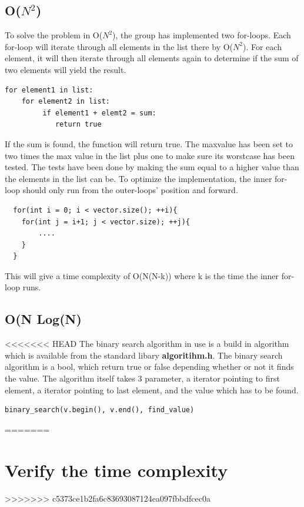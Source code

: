 \subsection{O(\(N^{2}\))}
To solve the problem in O(\(N^{2}\)), the group has implemented two for-loops. Each for-loop will iterate through all elements in the list there by O(\(N^{2}\)). For each element, it will then iterate through all elements again to determine if the sum of two elements will yield the result.
\begin{lstlisting}
for element1 in list:
    for element2 in list:
         if element1 + elemt2 = sum:
            return true
\end{lstlisting}
If the sum is found, the function will return true.
The maxvalue has been set to two times the max value in the list plus one to make sure its worstcase has been tested.
The tests have been done by making the sum equal to a higher value than the elements in the list can be.
To optimize the implementation, the inner for-loop should only run from the outer-loops' position and forward.
\begin{lstlisting}
  for(int i = 0; i < vector.size(); ++i){
  	for(int j = i+1; j < vector.size); ++j){
  		....
  	}
  }
\end{lstlisting}

This will give a time complexity of O(N(N-k)) where k is the time the inner for-loop runs.
\subsection{O(N Log(N)}

<<<<<<< HEAD
The binary search algorithm in use is a build in algorithm which is available from the standard libary \textbf{algoritihm.h}. The binary search algorithm is a bool, which return true or false depending whether or not it finds the value.  The algorithm itself takes 3 parameter, 	a iterator pointing to first element, a iterator pointing to last element, and the value which has to be found. 
\begin{lstlisting}
binary_search(v.begin(), v.end(), find_value)
\end{lstlisting}

=======
\section{Verify the time complexity}
>>>>>>> c5373ce1b2fa6c83693087124ea097fbbdfcec0a

